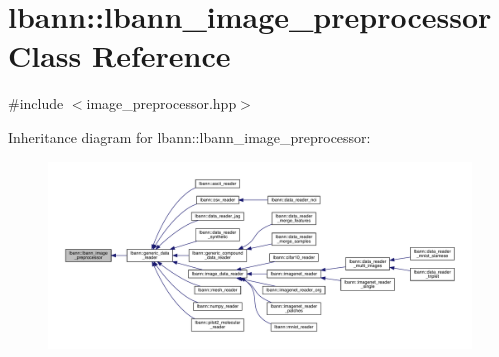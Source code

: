 \hypertarget{classlbann_1_1lbann__image__preprocessor}{}\section{lbann\+:\+:lbann\+\_\+image\+\_\+preprocessor Class Reference}
\label{classlbann_1_1lbann__image__preprocessor}


{\ttfamily \#include $<$image\+\_\+preprocessor.\+hpp$>$}



Inheritance diagram for lbann\+:\+:lbann\+\_\+image\+\_\+preprocessor\+:\nopagebreak
\begin{figure}[H]
\begin{center}
\leavevmode
\includegraphics[width=350pt]{classlbann_1_1lbann__image__preprocessor__inherit__graph}
\end{center}
\end{figure}
